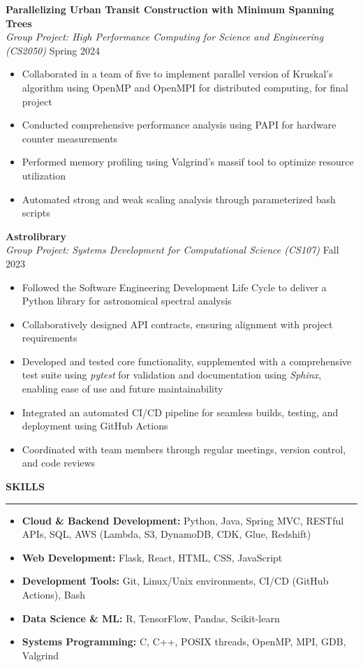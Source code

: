 \documentclass[11pt,a4paper]{article}
\newcommand{\sectionheading}[1]{\vspace{0.2cm}\textbf{\Large #1}\vspace{0.1cm}\hrule\vspace{0.3cm}}
\newcommand{\subheading}[1]{\textbf{#1}}
\newcommand{\daterange}[1]{\hfill{#1}}
\begin{document}
\medbreak
\subheading{Parallelizing Urban Transit Construction with Minimum Spanning Trees}\\
\textit{Group Project: High Performance Computing for Science and Engineering (CS2050)} \daterange{Spring 2024}
\begin{itemize}[leftmargin=*,nosep]
    \item Collaborated in a team of five to implement parallel version of Kruskal's algorithm using OpenMP and OpenMPI for distributed computing, for final project
    \item Conducted comprehensive performance analysis using PAPI for hardware counter measurements
    \item Performed memory profiling using Valgrind's massif tool to optimize resource utilization
    \item Automated strong and weak scaling analysis through parameterized bash scripts
\end{itemize}
\medbreak
\subheading{Astrolibrary} \\
\textit{Group Project: Systems Development for Computational Science (CS107)} \daterange{Fall 2023}
\begin{itemize}[leftmargin=*,nosep]
    \item Followed the Software Engineering Development Life Cycle to deliver a Python library for astronomical spectral analysis
    \item Collaboratively designed API contracts, ensuring alignment with project requirements
    \item Developed and tested core functionality, supplemented with a comprehensive test suite using \textit{pytest} for validation and documentation using \textit{Sphinx}, enabling ease of use and future maintainability
    \item Integrated an automated CI/CD pipeline for seamless builds, testing, and deployment using GitHub Actions
    \item Coordinated with team members through regular meetings, version control, and code reviews
\end{itemize}


\sectionheading{SKILLS}
\begin{itemize}[leftmargin=*,nosep]
    \item \textbf{Cloud \& Backend Development:} Python, Java, Spring MVC, RESTful APIs, SQL, AWS (Lambda, S3, DynamoDB, CDK, Glue, Redshift)
    \item \textbf{Web Development:} Flask, React, HTML, CSS, JavaScript
    \item \textbf{Development Tools:} Git, Linux/Unix environments, CI/CD (GitHub Actions), Bash
    \item \textbf{Data Science \& ML:} R, TensorFlow, Pandas, Scikit-learn
    \item \textbf{Systems Programming:} C, C++, POSIX threads, OpenMP, MPI, GDB, Valgrind
\end{itemize}
\end{document}
